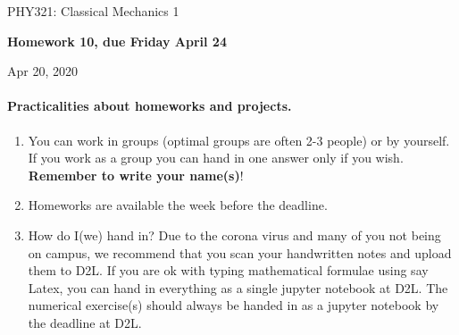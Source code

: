 \documentclass[%
oneside,                 %
final,                   %
10pt]{article}
\begin{document}

\newcommand{\exercisesection}[1]{\subsection*{#1}}






\thispagestyle{empty}

\begin{center}
{\LARGE\bf
\begin{spacing}{1.25}
PHY321: Classical Mechanics 1
\end{spacing}
}
\end{center}


\begin{center}
{\bf Homework 10, due Friday  April 24${}^{}$} \\ [0mm]
\end{center}

\begin{center}
\end{center}
    

\begin{center}
Apr 20, 2020
\end{center}

\vspace{1cm}


\paragraph{Practicalities about  homeworks and projects.}
\begin{enumerate}
\item You can work in groups (optimal groups are often 2-3 people) or by yourself. If you work as a group you can hand in one answer only if you wish. \textbf{Remember to write your name(s)}!

\item Homeworks are available  the week before the deadline. 

\item How do I(we)  hand in?  Due to the corona virus and many of you not being on campus, we recommend that you scan your handwritten notes and upload them to D2L. If you are ok with typing mathematical formulae using say Latex, you can hand in everything as a single jupyter notebook at D2L. The numerical exercise(s) should always be handed in as a jupyter notebook by the deadline at D2L. 
\end{enumerate}
\end{document}
